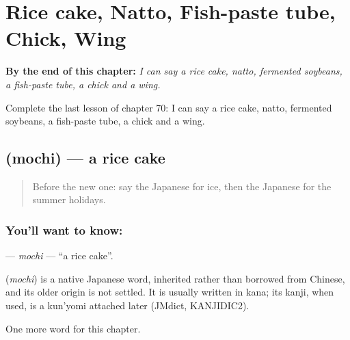 
\chapter{Rice cake, Natto, Fish-paste tube, Chick, Wing}
\label{ch:ja-rice-cake-natto-fish-paste-tube-chick-wing}

\begin{chapteropening}
\textbf{By the end of this chapter:} \emph{I can say a rice cake, natto, fermented soybeans, a fish-paste tube, a chick and a wing.}

Complete the last lesson of chapter 70: I can say a rice cake, natto, fermented soybeans, a fish-paste tube, a chick and a wing.
\end{chapteropening}

\section[\texorpdfstring{\ja{もち} (mochi)}{もち (mochi)}]{ (mochi) — a rice cake}

\label{lesson:JA-C70-mochi}



\begin{quote}
Before the new one: say the Japanese for ice, then the Japanese for the summer holidays.
\end{quote}

\subsection*{You'll want to know: }
\textbf{} — \emph{mochi} — \textquotedblleft{}a rice cake\textquotedblright{}.

\begin{cousinweb}
\textbf{} (\emph{mochi}) is a native Japanese word, inherited rather than borrowed from Chinese, and its older origin is not settled. It is usually written in kana; its kanji, when used, is a kun'yomi attached later (JMdict, KANJIDIC2).
\end{cousinweb}

\begin{grammarlens}[title={What you've built}]
One more word for this chapter.
\end{grammarlens}

